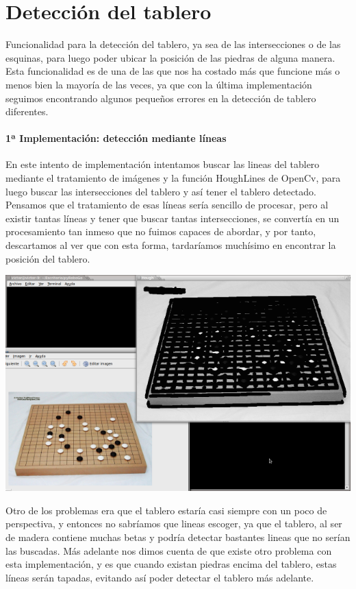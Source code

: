 \documentclass[12pt,a4paper]{report}
\begin{document}
\section{Detección del tablero} 

Funcionalidad para la detección del tablero, ya sea de las intersecciones o de
las esquinas, para luego poder ubicar la posición de las piedras de alguna
manera. Esta funcionalidad es de una de las que nos ha costado más que funcione
más o menos bien la mayoría de las veces, ya que con la última implementación
seguimos encontrando algunos pequeños errores en la detección de tablero
diferentes. 

\paragraph{1ª Implementación: detección mediante líneas}

En este intento de implementación intentamos buscar las lineas del tablero 
mediante el tratamiento de imágenes y la función HoughLines de OpenCv, para 
luego buscar las intersecciones del tablero y así tener el tablero detectado. 
Pensamos que el tratamiento de esas líneas sería sencillo de procesar, pero al
existir tantas líneas y tener que buscar tantas intersecciones, se convertía en
un procesamiento tan inmeso que no fuimos capaces de abordar, y por tanto,
descartamos al ver que con esta forma, tardaríamos muchísimo en encontrar la
posición del tablero.

\includegraphics[scale=0.6]{detect-lineas.png}

Otro de los problemas era que el tablero estaría casi siempre con un poco de
perspectiva, y entonces no sabríamos que lineas escoger, ya que el tablero, al
ser de madera contiene muchas betas y podría detectar bastantes lineas que no
serían las buscadas. 
Más adelante nos dimos cuenta de que existe otro problema con esta
implementación, y es que cuando existan piedras encima del tablero, estas líneas
serán tapadas, evitando así poder detectar el tablero más adelante.
 
\end{document}
